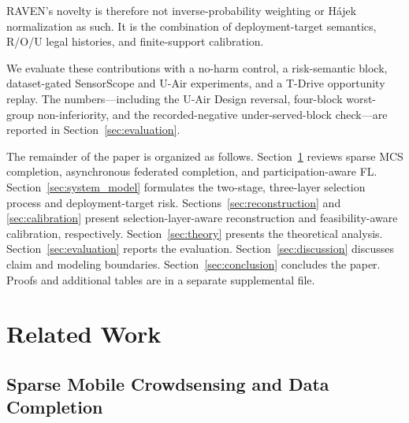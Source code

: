 \documentclass[letterpaper,journal]{IEEEtran}
\begin{document}
RAVEN's novelty is therefore not inverse-probability weighting or H\'ajek
normalization as such.  It is the combination of deployment-target semantics,
R/O/U legal histories, and finite-support calibration.

We evaluate these contributions with a no-harm control, a risk-semantic
block, dataset-gated SensorScope and U-Air experiments, and a T-Drive
opportunity replay.  The numbers---including the U-Air Design reversal,
four-block worst-group non-inferiority, and the recorded-negative
under-served-block check---are reported in
Section~\ref{sec:evaluation}.

The remainder of the paper is organized as follows.
Section~\ref{sec:related_work} reviews sparse MCS completion, asynchronous
federated completion, and participation-aware FL.
Section~\ref{sec:system_model} formulates the two-stage, three-layer selection
process and deployment-target risk.
Sections~\ref{sec:reconstruction} and \ref{sec:calibration} present
selection-layer-aware reconstruction and feasibility-aware calibration,
respectively.
Section~\ref{sec:theory} presents the theoretical analysis.
Section~\ref{sec:evaluation} reports the evaluation.
Section~\ref{sec:discussion} discusses claim and modeling boundaries.
Section~\ref{sec:conclusion} concludes the paper.
Proofs and additional tables are in a separate supplemental file.


\section{Related Work}
\label{sec:related_work}

\subsection{Sparse Mobile Crowdsensing and Data Completion}
\end{document}
